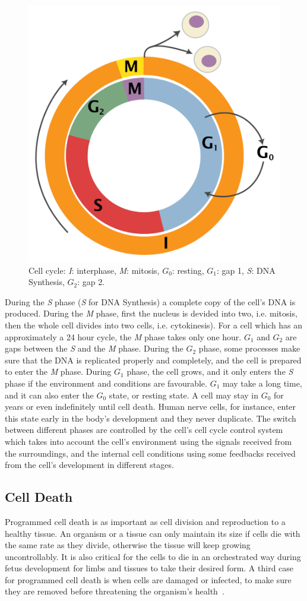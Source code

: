 \begin{figure}[!ht]
  \centering
  \includegraphics[width=.5\textwidth]{figs/background/470px-Cell_Cycle_2-2}
  \caption{Cell cycle: \emph{I}: interphase, \emph{M}: mitosis, \emph{$G_0$}: resting, \emph{$G_1$}: gap 1, \emph{S}: DNA Synthesis, \emph{$G_2$}: gap 2.\protect\footnotemark}
  \label{fig:bkg:cell-cycle}
\end{figure}

During the \emph{S} phase (\emph{S} for DNA Synthesis) a complete copy of the cell's DNA is produced. During the \emph{M} phase, first the nucleus is devided into two, i.e. mitosis, then the whole cell divides into two cells, i.e. cytokinesis). For a cell which has an approximately a 24 hour cycle, the \emph{M} phase takes only one hour. $G_1$ and $G_2$ are gaps between the \emph{S} and the \emph{M} phase. During the $G_2$ phase, some processes make sure that the DNA is replicated properly and completely, and the cell is prepared to enter the \emph{M} phase. During $G_1$ phase, the cell grows, and it only enters the \emph{S} phase if the environment and conditions are favourable. $G_1$ may take a long time, and it can also enter the $G_0$ state, or resting state. A cell may stay in $G_0$ for years or even indefinitely until cell death. Human nerve cells, for instance, enter this state early in the body's development and they never duplicate. The switch between different phases are controlled by the cell's cell cycle control system which takes into account the cell's environment using the signals received from the surroundings, and the internal cell conditions using some feedbacks received from the cell's development in different stages.

\subsection{Cell Death}
Programmed cell death is as important as cell division and reproduction to a healthy tissue. An organism or a tissue can only maintain its size if cells die with the same rate as they divide, otherwise the tissue will keep growing uncontrollably. It is also critical for the cells to die in an orchestrated way during fetus development for limbs and tissues to take their desired form. A third case for programmed cell death is when cells are damaged or infected, to make sure they are removed before threatening the organism's health~\cite[Ch. 18]{the-cell}.

